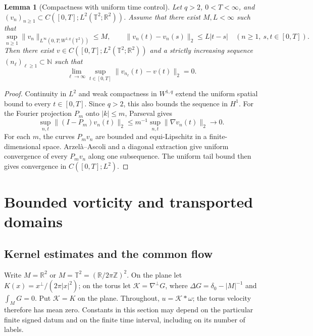 \documentclass[11pt]{amsart}
\newtheorem{lemma}[theorem]{Lemma}
\theoremstyle{remark}
\numberwithin{equation}{section}
\newcommand{\R}{\mathbb R}
\newcommand{\T}{\mathbb T}
\begin{document}
\begin{lemma}[Compactness with uniform time control]
\label{pre:compactness}
Let $q>2$, $0<T<\infty$, and
$(v_n)_{n\ge1}\subset C([0,T];L^2(\T^2;\R^2))$.
Assume that there exist $M,L<\infty$ such that
\[
 \sup_{n\ge1}\|v_n\|_{L^\infty(0,T;W^{1,q}(\T^2))}\le M,
 \qquad
 \|v_n(t)-v_n(s)\|_2\le L|t-s|
 \quad(n\ge1,\ s,t\in[0,T]).
\]
Then there exist $v\in C([0,T];L^2(\T^2;\R^2))$ and a strictly
increasing sequence $(n_\ell)_{\ell\ge1}\subset\mathbb N$ such that
\[
 \lim_{\ell\to\infty}\sup_{t\in[0,T]}
       \|v_{n_\ell}(t)-v(t)\|_2=0.
\]
\end{lemma}
\begin{proof}
Continuity in $L^2$ and weak compactness in $W^{1,q}$ extend the
uniform spatial bound to every $t\in[0,T]$. Since $q>2$, this also
bounds the sequence in $H^1$. For the Fourier projection $P_m$ onto
$|k|\le m$, Parseval gives
\[
 \sup_{n,t}\|(I-P_m)v_n(t)\|_2
 \le m^{-1}\sup_{n,t}\|\nabla v_n(t)\|_2\longrightarrow0.
\]
For each $m$, the curves $P_mv_n$ are bounded and equi-Lipschitz in
a finite-dimensional space. Arzel\`a--Ascoli and a diagonal extraction
give uniform convergence of every $P_mv_n$ along one subsequence.
The uniform tail bound then gives convergence in $C([0,T];L^2)$.
\end{proof}



\section{Bounded vorticity and transported domains}\label{part:bv}
\subsection{Kernel estimates and the common flow}\label{bv:section}

Write $M=\R^2$ or $M=\T^2=(\R/2\pi\mathbb Z)^2$. On the
plane let $K(x)=x^\perp/(2\pi|x|^2)$; on the torus let
$\mathcal K=\nabla^\perp G$, where
$\Delta G=\delta_0-|M|^{-1}$ and $\int_MG=0$. Put
$\mathcal K=K$ on the plane. Throughout, $u=\mathcal K*\omega$;
the torus velocity therefore has mean zero. Constants in this
section may depend on the particular finite signed datum and
on the finite time interval, including on its number of labels.
\end{document}
